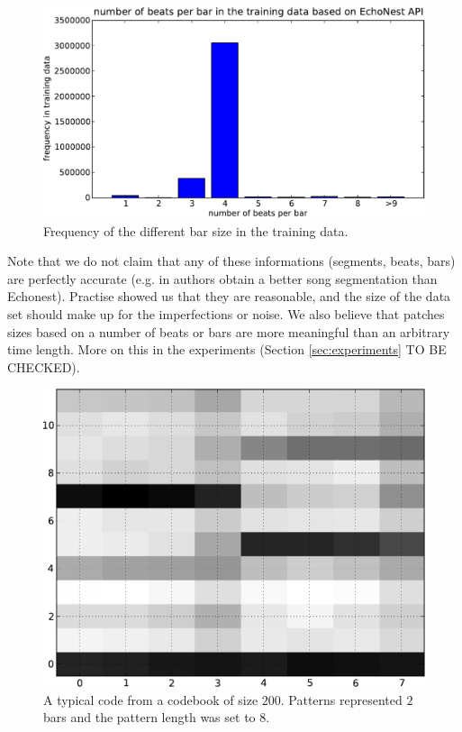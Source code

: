 \documentclass{article}
\begin{document}
\begin{figure}[htb]
\begin{center}
\includegraphics[width=.9\columnwidth]{bar_size_freq}
\end{center}
\caption{\small{
Frequency of the different bar size in the training data.
}}
\label{fig:barsize}
\end{figure}

Note that we do not claim that any of these informations (segments, beats, bars)
are perfectly accurate (e.g. in \cite{Barrington2009a} authors obtain a better
song segmentation than Echonest). Practise showed us that they are reasonable, 
and the size of the data set should make up for the imperfections or noise.
We also believe that patches sizes based on a number of beats or bars are more
meaningful than an arbitrary time length. More on this in the experiments
(Section \ref{sec:experiments} TO BE CHECKED).

\begin{figure}[htb]
\begin{center}
\includegraphics[width=.6\columnwidth]{code}
\end{center}
\caption{\small{A typical code from a codebook of size $200$. 
Patterns represented
$2$ bars and the pattern length was set to $8$.
}}
\label{fig:code}
\end{figure}
\end{document}
